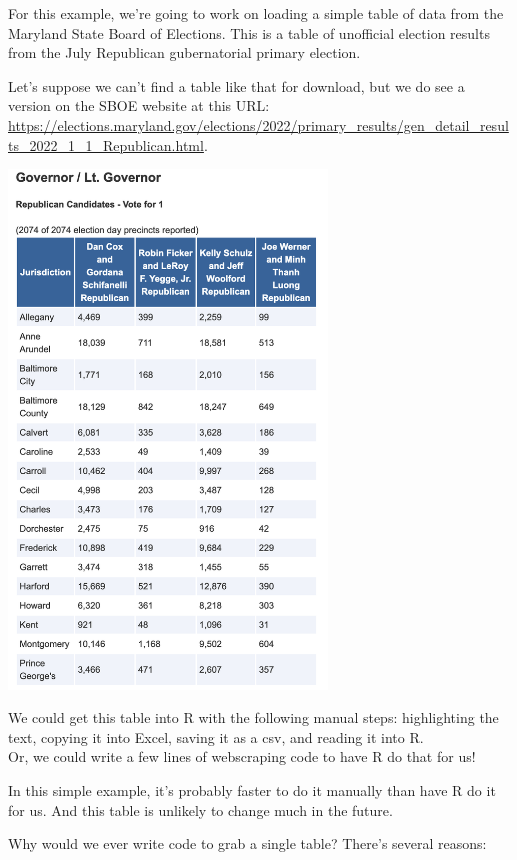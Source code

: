 \documentclass[
  letterpaper,
  DIV=11,
  numbers=noendperiod]{scrreprt}
\begin{document}
For this example, we're going to work on loading a simple table of data
from the Maryland State Board of Elections. This is a table of
unofficial election results from the July Republican gubernatorial
primary election.

Let's suppose we can't find a table like that for download, but we do
see a version on the SBOE website at this URL:
\url{https://elections.maryland.gov/elections/2022/primary_results/gen_detail_results_2022_1_1_Republican.html}.

\includegraphics[width=3.33in,height=\textheight]{./images/rvest1.png}

We could get this table into R with the following manual steps:
highlighting the text, copying it into Excel, saving it as a csv, and
reading it into R.\\
Or, we could write a few lines of webscraping code to have R do that for
us!

In this simple example, it's probably faster to do it manually than have
R do it for us. And this table is unlikely to change much in the future.

Why would we ever write code to grab a single table? There's several
reasons:
\end{document}
